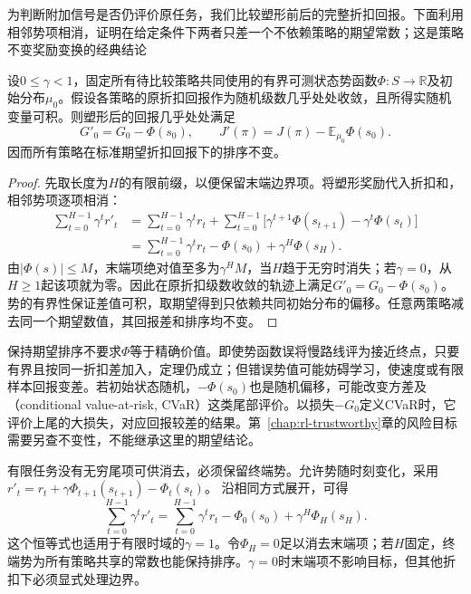 为判断附加信号是否仍评价原任务，我们比较塑形前后的完整折扣回报。下面利用相邻势项相消，证明在给定条件下两者只差一个不依赖策略的期望常数；这是策略不变奖励变换的经典结论

\begin{theorem}[无限折扣时域的塑形不变性]
  \label{thm:rl-reward-shaping}
  设$0\leq\gamma<1$，固定所有待比较策略共同使用的有界可测状态势函数$\Phi:S\to\mathbb R$及初始分布$\mu_0$。假设各策略的原折扣回报作为随机级数几乎处处收敛，且所得实随机变量可积。则塑形后的回报几乎处处满足
  \[
    G'_0=G_0-\Phi(s_0),\qquad
    J'(\pi)=J(\pi)-\mathbb E_{\mu_0}\Phi(s_0).
  \]
  因而所有策略在标准期望折扣回报下的排序不变。
\end{theorem}

\begin{proof}
  先取长度为$H$的有限前缀，以便保留末端边界项。将塑形奖励代入折扣和，相邻势项逐项相消：
  \begin{align*}
    \sum_{t=0}^{H-1}\gamma^t r'_t
    &=\sum_{t=0}^{H-1}\gamma^t r_t
       +\sum_{t=0}^{H-1}
          \bigl[\gamma^{t+1}\Phi(s_{t+1})
                          -\gamma^t\Phi(s_t)\bigr]\\
    &=\sum_{t=0}^{H-1}\gamma^t r_t
       -\Phi(s_0)+\gamma^H\Phi(s_H).
  \end{align*}
  由$|\Phi(s)|\leq M$，末端项绝对值至多为$\gamma^H M$，当$H$趋于无穷时消失；若$\gamma=0$，从$H\geq1$起该项就为零。因此在原折扣级数收敛的轨迹上满足$G'_0=G_0-\Phi(s_0)$。势的有界性保证差值可积，取期望得到只依赖共同初始分布的偏移。任意两策略减去同一个期望数值，其回报差和排序均不变。
\end{proof}

保持期望排序不要求$\Phi$等于精确价值。即使势函数误将慢路线评为接近终点，只要有界且按同一折扣差加入，定理仍成立；但错误势值可能妨碍学习，使速度或有限样本回报变差。若初始状态随机，$-\Phi(s_0)$也是随机偏移，可能改变方差及（conditional value-at-risk, CVaR）这类尾部评价。以损失$-G_0$定义CVaR时，它评价上尾的大损失，对应回报较差的结果。第~\ref{chap:rl-trustworthy}章的风险目标需要另查不变性，不能继承这里的期望结论。

有限任务没有无穷尾项可供消去，必须保留终端势。允许势随时刻变化，采用
$r'_t=r_t+\gamma\Phi_{t+1}(s_{t+1})-\Phi_t(s_t)$。
沿相同方式展开，可得
\begin{equation}
  \sum_{t=0}^{H-1}\gamma^t r'_t
  =\sum_{t=0}^{H-1}\gamma^t r_t
      -\Phi_0(s_0)+\gamma^H\Phi_H(s_H).
  \label{eq:rl-reward-shaping-terminal}
\end{equation}
这个恒等式也适用于有限时域的$\gamma=1$。令$\Phi_H=0$足以消去末端项；若$H$固定，终端势为所有策略共享的常数也能保持排序。$\gamma=0$时末端项不影响目标，但其他折扣下必须显式处理边界。

